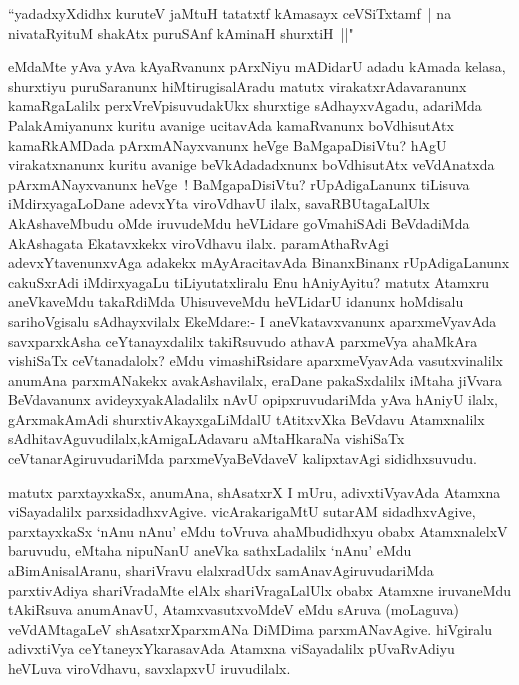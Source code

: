 \begin{shl}
``yadadxyXdidhx kuruteV jaMtuH tatatxtf kAmasayx ceVSiTxtamf~|
na nivataRyituM shakAtx puruSAnf kAminaH shurxtiH~||"
\end{shl}

\begin{artha}
eMdaMte yAva yAva kAyaRvanunx pArxNiyu mADidarU adadu  kAmada kelasa,
shurxtiyu puruSaranunx hiMtirugisalAradu matutx virakatxrAdavaranunx
kamaRgaLalilx perxVreVpisuvudakUkx shurxtige sAdhayxvAgadu, adariMda
PalakAmiyanunx kuritu avanige ucitavAda kamaRvanunx boVdhisutAtx
kamaRkAMDada pArxmANayxvanunx heVge BaMgapaDisiVtu? hAgU virakatxnanunx
kuritu avanige beVkAdadadxnunx boVdhisutAtx veVdAnatxda pArxmANayxvanunx
heVge~! BaMgapaDisiVtu? rUpAdigaLanunx tiLisuva iMdirxyagaLoDane
adevxYta viroVdhavU ilalx, savaRBUtagaLalUlx AkAshaveMbudu
oMde iruvudeMdu heVLidare goVmahiSAdi BeVdadiMda AkAshagata Ekatavxkekx
viroVdhavu ilalx. paramAthaRvAgi adevxYtavenunxvAga adakekx
mAyAracitavAda BinanxBinanx rUpAdigaLanunx cakuSxrAdi iMdirxyagaLu
tiLiyutatxliralu Enu hAniyAyitu? matutx Atamxru aneVkaveMdu
takaRdiMda UhisuveveMdu heVLidarU idanunx hoMdisalu sarihoVgisalu
sAdhayxvilalx EkeMdare:- I aneVkatavxvanunx aparxmeVyavAda
savxparxkAsha ceYtanayxdalilx takiRsuvudo athavA parxmeVya ahaMkAra
vishiSaTx ceVtanadalolx? eMdu vimashiRsidare aparxmeVyavAda
vasutxvinalilx anumAna parxmANakekx avakAshavilalx, eraDane
pakaSxdalilx iMtaha jiVvara BeVdavanunx avideyxyakAladalilx nAvU
opipxruvudariMda yAva hAniyU ilalx, gArxmakAmAdi shurxtivAkayxgaLiMdalU
tAtitxvXka BeVdavu Atamxnalilx sAdhitavAguvudilalx,\break kAmigaLAdavaru
aMtaHkaraNa vishiSaTx ceVtanarAgiruvudariMda parxmeVyaBeVdaveV
kalipxtavAgi sididhxsuvudu.

matutx parxtayxkaSx, anumAna, shAsatxrX I mUru, adivxtiVyavAda Atamxna
viSayadalilx parxsidadhxvAgive. vicArakarigaMtU sutarAM sidadhxvAgive,
parxtayxkaSx `nAnu nAnu' eMdu toVruva ahaMbudidhxyu obabx AtamxnalelxV
baruvudu, eMtaha nipuNanU aneVka sathxLadalilx `nAnu' eMdu
aBimAnisalAranu, shariVravu elalxradUdx samAnavAgiruvudariMda
parxtivAdiya shariVradaMte elAlx shariVragaLalUlx obabx Atamxne
iruvaneMdu tAkiRsuva anumAnavU, AtamxvasutxvoMdeV eMdu sAruva
(moLaguva) veVdAMtagaLeV shAsatxrXparxmANa DiMDima
parxmANavAgive. hiVgiralu adivxtiVya ceYtaneyxYkarasavAda Atamxna
viSayadalilx pUvaRvAdiyu heVLuva viroVdhavu, savxlapxvU iruvudilalx.
\end{artha}


